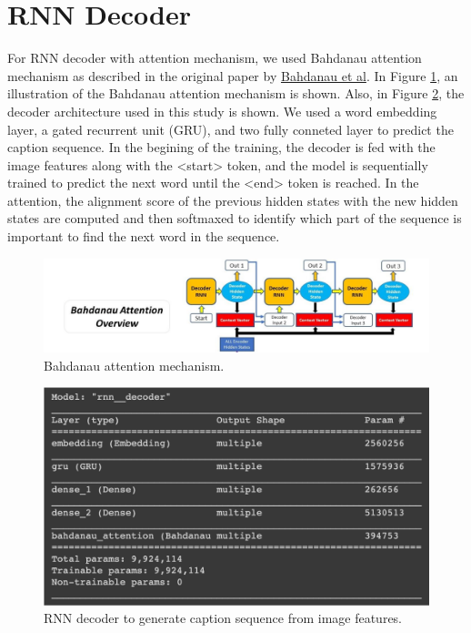 \documentclass[12pt]{article}
\begin{document}
\section{RNN Decoder}
\label{sec:imfeat}

For RNN decoder with attention mechanism, we used Bahdanau attention mechanism as described in the original paper by \href{https://arxiv.org/abs/1409.0473}{Bahdanau et al}. In Figure \ref{fig:BA}, an illustration of the Bahdanau attention mechanism is shown. Also, in Figure \ref{fig:decoder}, the decoder architecture used in this study is shown. We used a word embedding layer, a gated recurrent unit (GRU), and two fully conneted layer to predict the caption sequence. In the begining of the training, the decoder is fed with the image features along with the <start> token, and the model is sequentially trained to predict the next word until the <end> token is reached. In the attention, the alignment score of the previous hidden states with the new hidden states are computed and then softmaxed to identify which part of the sequence is important to find the next word in the sequence.


\begin{figure}[h!]
\begin{center}
\includegraphics[width=7in]{BA.png}
\end{center}
\caption{\label{fig:BA}
Bahdanau attention mechanism.}
\end{figure}

\begin{figure}[h!]
\begin{center}
\includegraphics[width=7in]{decoder.png}
\end{center}
\caption{\label{fig:decoder}
RNN decoder to generate caption sequence from image features.}
\end{figure}
\end{document}
